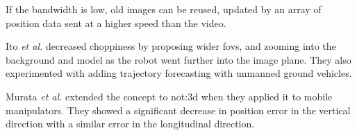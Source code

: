 If the bandwidth is low, old images can be reused, updated by an array of position data sent at a higher speed than the video.

Ito \emph{et al.} decreased choppiness by proposing wider \glspl{fov}, and zooming into the background and model as the robot went further into the image plane.\cite{ito2008} They also experimented with adding trajectory forecasting with unmanned ground vehicles.

Murata \emph{et al.} extended the concept to \gls{not:3d} when they applied it to mobile manipulators.\cite{murata2014}
They showed a significant decrease in position error in the vertical direction with a similar error in the longitudinal direction.

